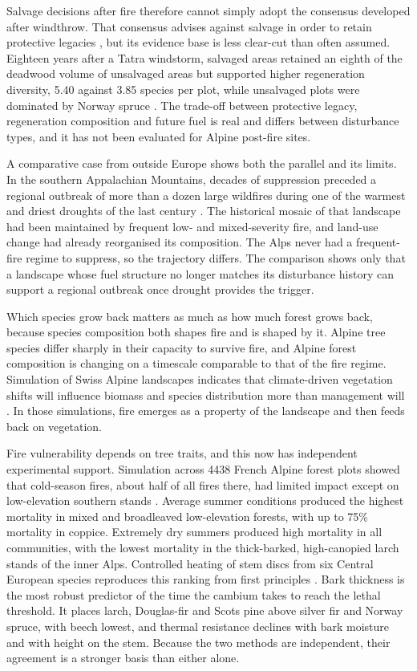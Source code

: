 \documentclass[11pt,a4paper]{article}
\begin{document}
Salvage decisions after fire therefore cannot simply adopt the consensus developed after windthrow. That consensus advises against salvage in order to retain protective legacies \citep{costa_biological_2021}, but its evidence base is less clear-cut than often assumed. Eighteen years after a Tatra windstorm, salvaged areas retained an eighth of the deadwood volume of unsalvaged areas but supported higher regeneration diversity, 5.40 against 3.85 species per plot, while unsalvaged plots were dominated by Norway spruce \citep{seben_impact_2024}. The trade-off between protective legacy, regeneration composition and future fuel is real and differs between disturbance types, and it has not been evaluated for Alpine post-fire sites.

A comparative case from outside Europe shows both the parallel and its limits. In the southern Appalachian Mountains, decades of suppression preceded a regional outbreak of more than a dozen large wildfires during one of the warmest and driest droughts of the last century \citep{reilly_drivers_2022}. The historical mosaic of that landscape had been maintained by frequent low- and mixed-severity fire, and land-use change had already reorganised its composition. The Alps never had a frequent-fire regime to suppress, so the trajectory differs. The comparison shows only that a landscape whose fuel structure no longer matches its disturbance history can support a regional outbreak once drought provides the trigger.

Which species grow back matters as much as how much forest grows back, because species composition both shapes fire and is shaped by it. Alpine tree species differ sharply in their capacity to survive fire, and Alpine forest composition is changing on a timescale comparable to that of the fire regime. Simulation of Swiss Alpine landscapes indicates that climate-driven vegetation shifts will influence biomass and species distribution more than management will \citep{schumacher_relative_2006}. In those simulations, fire emerges as a property of the landscape and then feeds back on vegetation.

Fire vulnerability depends on tree traits, and this now has independent experimental support. Simulation across 4438 French Alpine forest plots showed that cold-season fires, about half of all fires there, had limited impact except on low-elevation southern stands \citep{dupire_vulnerability_2019}. Average summer conditions produced the highest mortality in mixed and broadleaved low-elevation forests, with up to 75\% mortality in coppice. Extremely dry summers produced high mortality in all communities, with the lowest mortality in the thick-barked, high-canopied larch stands of the inner Alps. Controlled heating of stem discs from six Central European species reproduces this ranking from first principles \citep{mutterer_bark_2026}. Bark thickness is the most robust predictor of the time the cambium takes to reach the lethal threshold. It places larch, Douglas-fir and Scots pine above silver fir and Norway spruce, with beech lowest, and thermal resistance declines with bark moisture and with height on the stem. Because the two methods are independent, their agreement is a stronger basis than either alone.
\end{document}
